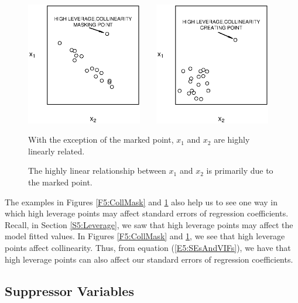 \begin{figure}[htp]
    \includegraphics[width=0.45\textwidth]{Chapter5/F5CollMask.eps}
    $~~~~~~$
    \includegraphics[width=0.45\textwidth]{Chapter5/F5CollInduce.eps}    \hfill
      \parbox[t]{2.5in}{\caption{\label{F5:CollMask} \small  With the exception of
the marked point, $x_1$ and $x_2$ are highly linearly related.}}
\hfill
        \parbox[t]{2.5in}{ \caption{\label{F5:CollInduce} \small  The highly linear relationship
between $x_1$ and $x_2$ is primarily due to the marked point.}}
\end{figure}


The examples in Figures \ref{F5:CollMask} and \ref{F5:CollInduce}
also help us to see one way in which high leverage points may affect
standard errors of regression coefficients. Recall, in Section
\ref{S5:Leverage}, we saw that high leverage points may affect the
model fitted values. In Figures \ref{F5:CollMask} and
\ref{F5:CollInduce}, we see that high leverage points affect
collinearity. Thus, from equation (\ref{E5:SEsAndVIFs}), we have
that high leverage points can also affect our standard errors of
regression coefficients.

\subsection{Suppressor Variables}\label{S5:Suppressor}

